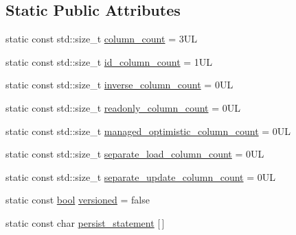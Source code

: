 \subsection*{Static Public Attributes}
\begin{DoxyCompactItemize}
\item 
static const std\+::size\+\_\+t \hyperlink{classodb_1_1access_1_1object__traits__impl_3_01_1_1_graph_class_00_01id__pgsql_01_4_a3c2b1957394b0a20d38cdc1437650bda}{column\+\_\+count} = 3\+U\+L
\item 
static const std\+::size\+\_\+t \hyperlink{classodb_1_1access_1_1object__traits__impl_3_01_1_1_graph_class_00_01id__pgsql_01_4_a2db4170dcee2c7f748c978eaeff9e385}{id\+\_\+column\+\_\+count} = 1\+U\+L
\item 
static const std\+::size\+\_\+t \hyperlink{classodb_1_1access_1_1object__traits__impl_3_01_1_1_graph_class_00_01id__pgsql_01_4_a0a43ecb22b6b3f6c4c29c7885a7ef7ec}{inverse\+\_\+column\+\_\+count} = 0\+U\+L
\item 
static const std\+::size\+\_\+t \hyperlink{classodb_1_1access_1_1object__traits__impl_3_01_1_1_graph_class_00_01id__pgsql_01_4_a81bbffc0f338a44316f1ea2f0df52efb}{readonly\+\_\+column\+\_\+count} = 0\+U\+L
\item 
static const std\+::size\+\_\+t \hyperlink{classodb_1_1access_1_1object__traits__impl_3_01_1_1_graph_class_00_01id__pgsql_01_4_a7cc9b0d678ff289e5d2b468aa56312b3}{managed\+\_\+optimistic\+\_\+column\+\_\+count} = 0\+U\+L
\item 
static const std\+::size\+\_\+t \hyperlink{classodb_1_1access_1_1object__traits__impl_3_01_1_1_graph_class_00_01id__pgsql_01_4_aa6f626ec818f8eb7513e67e0497ee422}{separate\+\_\+load\+\_\+column\+\_\+count} = 0\+U\+L
\item 
static const std\+::size\+\_\+t \hyperlink{classodb_1_1access_1_1object__traits__impl_3_01_1_1_graph_class_00_01id__pgsql_01_4_a83747a186e6b318bc7466b58cb6bc066}{separate\+\_\+update\+\_\+column\+\_\+count} = 0\+U\+L
\item 
static const \hyperlink{classodb_1_1access_1_1object__traits_3_01_1_1_graph_class_01_4_adb6d76b31575782f2c201eb3ab510e59}{bool} \hyperlink{classodb_1_1access_1_1object__traits__impl_3_01_1_1_graph_class_00_01id__pgsql_01_4_a87b3909997f588604ea9a6758a5cdf55}{versioned} = false
\item 
static const char \hyperlink{classodb_1_1access_1_1object__traits__impl_3_01_1_1_graph_class_00_01id__pgsql_01_4_a5335a218576601ae784471b44a604640}{persist\+\_\+statement} \mbox{[}$\,$\mbox{]}

\end{DoxyCompactItemize}
